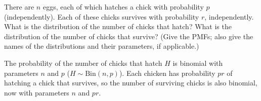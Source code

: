 
\setcounter{theorem}{13}

\begin{exercise}[BH.3.28]
  There are $n$ eggs, each of which hatches a chick with probability $p$ (independently). Each of these chicks survives with probability $r$, independently. What is the distribution of the number of chicks that hatch? What is the distribution of the number of chicks that survive? (Give the PMFs; also give the names of the distributions and their parameters, if applicable.)
\begin{solution}
	The probability of the number of chicks that hatch $H$ is binomial with parameters $n$ and $p$ ($H\sim \text{Bin}(n,p)$). Each chicken has probability $pr$ of hatching a chick that survives, so the number of surviving chicks is also binomial, now with parameters $n$ and $pr$.
\end{solution}
\end{exercise}



